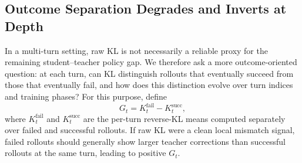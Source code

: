 


\subsection{Outcome Separation Degrades and Inverts at Depth}
In a multi-turn setting, raw KL is not necessarily a reliable proxy for the
remaining student--teacher policy gap. We therefore ask a more outcome-oriented
question: at each turn, can KL distinguish rollouts that eventually succeed from
those that eventually fail, and how does this distinction evolve over turn indices and training phases?
For this purpose, define
\begin{equation}
G_t = K_t^{\mathrm{fail}} - K_t^{\mathrm{succ}},
\end{equation}
where $K_t^{\mathrm{fail}}$ and $K_t^{\mathrm{succ}}$ are the per-turn
reverse-KL means computed separately over failed and successful rollouts.
If raw KL were a clean local mismatch signal, failed rollouts should generally
show larger teacher corrections than successful rollouts at the same turn, leading to positive $G_t$.

